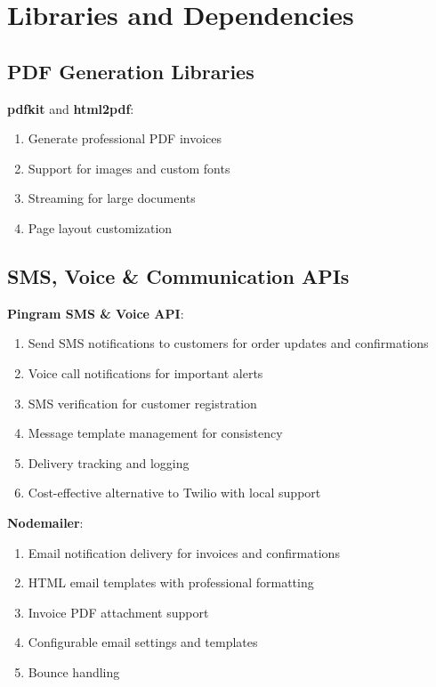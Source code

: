 \documentclass[12pt,a4paper]{report}
\begin{document}
\section{Libraries and Dependencies}

\subsection{PDF Generation Libraries}

\textbf{pdfkit} and \textbf{html2pdf}:
\begin{enumerate}[label=\roman*)]
    \item Generate professional PDF invoices
    \item Support for images and custom fonts
    \item Streaming for large documents
    \item Page layout customization
\end{enumerate}

\subsection{SMS, Voice \& Communication APIs}

\textbf{Pingram SMS \& Voice API}:
\begin{enumerate}[label=\roman*)]
    \item Send SMS notifications to customers for order updates and confirmations
    \item Voice call notifications for important alerts
    \item SMS verification for customer registration
    \item Message template management for consistency
    \item Delivery tracking and logging
    \item Cost-effective alternative to Twilio with local support
\end{enumerate}

\textbf{Nodemailer}:
\begin{enumerate}[label=\roman*)]
    \item Email notification delivery for invoices and confirmations
    \item HTML email templates with professional formatting
    \item Invoice PDF attachment support
    \item Configurable email settings and templates
    \item Bounce handling
\end{enumerate}
\end{document}
